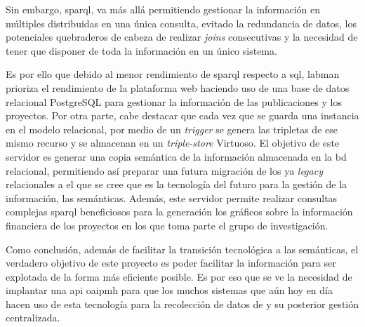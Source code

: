 Sin embargo, \acrshort{sparql}, va más allá permitiendo gestionar la información en múltiples  distribuidas en una única consulta, evitado la redundancia de datos, los potenciales quebraderos de cabeza de realizar \textit{joins} consecutivas y la necesidad de tener que disponer de toda la información en un único sistema.

Es por ello que debido al menor rendimiento de \acrshort{sparql} respecto a \acrshort{sql}, \acrshort{labman} prioriza el rendimiento de la plataforma web haciendo uso de una base de datos relacional PostgreSQL\cite{PostgreSQL} para gestionar la información de las publicaciones y los proyectos. Por otra parte, cabe destacar que cada vez que se guarda una instancia en el modelo relacional, por medio de un \textit{trigger} se genera las tripletas de ese mismo recurso y se almacenan en un \textit{triple-store} Virtuoso\cite{Virtuoso}. El objetivo de este servidor es generar una copia semántica de la información almacenada en la \acrshort{bd} relacional, permitiendo así preparar una futura migración  de los ya \textit{legacy}  relacionales a el que se cree que es la tecnología del futuro para la gestión de la información, las  semánticas. Además, este servidor permite realizar consultas complejas \acrshort{sparql} beneficiosos para la generación los gráficos sobre la información financiera de los proyectos en los que toma parte el grupo de investigación.

Como conclusión, además de facilitar la transición tecnológica a las  semánticas, el verdadero objetivo de este proyecto es poder facilitar la información para ser explotada de la forma más eficiente posible. Es por eso que se ve la necesidad de implantar una \acrfull{api} \acrshort{oaipmh} para que los muchos sistemas que aún hoy en día hacen uso de esta tecnología para la recolección de datos de y su posterior gestión centralizada.
